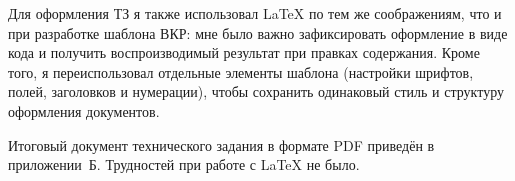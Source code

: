 Для оформления ТЗ я также использовал LaTeX по тем же соображениям, что и при разработке шаблона ВКР: мне было важно зафиксировать оформление в виде кода и получить воспроизводимый результат при правках содержания.
Кроме того, я переиспользовал отдельные элементы шаблона (настройки шрифтов, полей, заголовков и нумерации), чтобы сохранить одинаковый стиль и структуру оформления документов.

Итоговый документ технического задания в формате PDF приведён в приложении~Б. Трудностей при работе с LaTeX не было.
